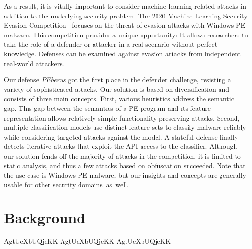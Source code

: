 \documentclass[conference]{IEEEtran}
\newcommand{\defnameit}{\textit{PEberus}\xspace}
\begin{document}
As a result, it is vitally important to consider machine
learning-related attacks in addition to the underlying security
problem. The 2020 Machine Learning Security Evasion 
Competition~\citep{web:Contest} focuses
on the threat of evasion attacks with Windows PE malware. This
competition provides a unique opportunity: It allows researchers to 
take the role of a defender or attacker in a real scenario without 
perfect knowledge. Defenses can be examined against evasion attacks 
from independent real-world attackers.

Our defense \defnameit got the first place in the defender challenge, 
resisting a variety of sophisticated attacks. Our solution is based on 
diversification and consists of three main concepts.
First, various heuristics address the semantic gap. This gap between 
the semantics of a PE program and its feature representation 
allows relatively simple functionality-preserving attacks.
Second, multiple classification models use distinct feature sets to
classify malware reliably while considering targeted attacks against
the model. A stateful defense finally detects iterative attacks that
exploit the API access to the classifier.
Although our solution fends off the majority of attacks in the
competition, it is limited to static analysis, and thus a few attacks
based on obfuscation succeeded. Note that the use-case is Windows
PE malware, but our insights and concepts are generally usable
for other security domains~as~well.

\section{Background}
AgtUeXbUQjeKK AgtUeXbUQjeKK AgtUeXbUQjeKK
\end{document}
